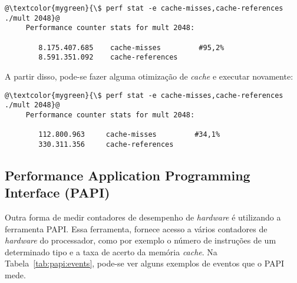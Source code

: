 \begin{lstlisting}[frame=none, numbers=none]
@\textcolor{mygreen}{\$ perf stat -e cache-misses,cache-references ./mult 2048}@
     Performance counter stats for mult 2048:

        8.175.407.685    cache-misses         #95,2%
        8.591.351.092    cache-references 
\end{lstlisting}

A partir disso, pode-se fazer alguma otimização de \textit{cache} e executar novamente:
\begin{lstlisting}[frame=none, numbers=none]
@\textcolor{mygreen}{\$ perf stat -e cache-misses,cache-references ./mult 2048}@
     Performance counter stats for mult 2048:

        112.800.963     cache-misses         #34,1%
        330.311.356     cache-references
\end{lstlisting}


\subsection{Performance Application Programming Interface (PAPI)} \label{sec:papi}

Outra forma de medir contadores de desempenho de \textit{hardware} é utilizando a ferramenta PAPI\cite{terpstra2010collecting, weaver2012measuring, johnson2012papi}. 
Essa ferramenta, fornece acesso a vários contadores de \textit{hardware} do processador, como por exemplo o número de instruções de um determinado tipo e a taxa de acerto da memória \textit{cache}. Na Tabela~\ref{tab:papi:events}, pode-se ver alguns exemplos de eventos que o PAPI mede.


